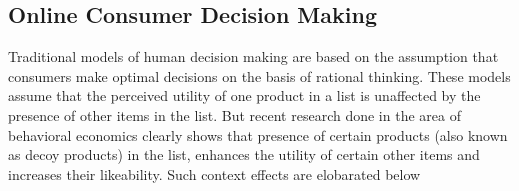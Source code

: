 \documentclass{llncs}
\begin{document}


\subsection{Online Consumer Decision Making}
\label{sec:onlineConsumerDecisionMaking}
Traditional models of human decision making are based on the assumption that consumers make optimal decisions on the basis of rational thinking. 
These models assume that the perceived utility of one product in a list is unaffected by the presence of other items in the list. 
But recent research done in the area of behavioral economics \cite{ariely} clearly shows that presence of certain products (also known as decoy products) in the list, enhances the utility of certain other items and increases their likeability. Such context effects are elobarated below
\end{document}
